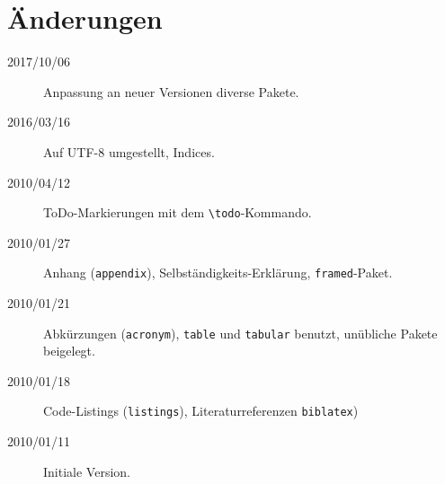 \chapter*{Änderungen}

\begin{description}
\item[2017/10/06] Anpassung an neuer Versionen diverse Pakete.
\item[2016/03/16] Auf UTF-8 umgestellt, Indices.
\item[2010/04/12] ToDo-Markierungen mit dem \verb+\todo+-Kommando.
\item[2010/01/27] Anhang (\texttt{appendix}), Selbständigkeits-Erklärung, \texttt{framed}-Paket.
\item[2010/01/21] Abkürzungen (\texttt{acronym}), \texttt{table} und \texttt{tabular} benutzt,
     unübliche Pakete beigelegt.
\item[2010/01/18] Code-Listings (\texttt{listings}), Literaturreferenzen \texttt{biblatex})
\item[2010/01/11] Initiale Version.
\end{description}
